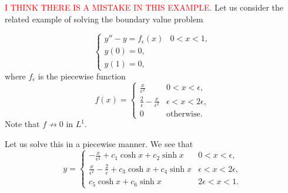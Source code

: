 \begin{example}
\textcolor{red}{I THINK THERE IS A MISTAKE IN THIS EXAMPLE.}
Let us consider the related example of solving the boundary value problem

\begin{equation}
\begin{cases}
y'' - y = f_\epsilon(x) & 0 < x < 1,\\
y(0) = 0,\\
y(1) = 0,
\end{cases}
\end{equation}
where $f_\epsilon$ is the piecewise function
\begin{equation}
f(x) = \begin{cases}
\frac{x}{\epsilon^2} & 0 < x < \epsilon,\\
\frac{2}{\epsilon} - \frac{x}{\epsilon^2} & \epsilon< x< 2\epsilon,\\
0 & \text{otherwise}.
\end{cases}
\end{equation}
Note that $f \not \to 0$ in $L^1$.

Let us solve this in a piecewise manner. We see that
\begin{equation}
y = \begin{cases}
-\frac{x}{\epsilon^2} + c_1 \cosh x + c_2 \sinh x & 0<x<\epsilon,\\
\frac{x}{\epsilon^2} - \frac{2}{\epsilon} + c_3 \cosh x + c_4 \sinh x & \epsilon < x < 2\epsilon,\\
c_5 \cosh x + c_6 \sinh x & 2\epsilon < x < 1.
\end{cases}
\end{equation}


\end{example}
